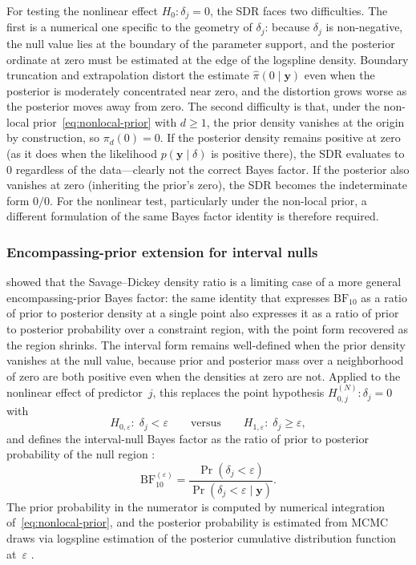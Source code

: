 \documentclass{article}
\begin{document}
For testing the nonlinear effect $H_0:\delta_j=0$, the SDR faces
two difficulties.
The first is a numerical one specific to the geometry of $\delta_j$:
because $\delta_j$ is non-negative, the null value lies at the boundary of the
parameter support, and the posterior ordinate at zero must be
estimated at the edge of the logspline density.
Boundary truncation and extrapolation distort the estimate
$\hat\pi(0\mid\mathbf{y})$ even when the posterior is moderately
concentrated near zero, and the distortion grows worse as the
posterior moves away from zero. The second difficulty is that, under the non-local prior~\eqref{eq:nonlocal-prior} with $d \ge 1$, the prior density vanishes at the origin by construction, so $\pi_d(0)=0$.
If the posterior density remains positive at zero (as it does when
the likelihood $p(\mathbf{y}\mid\delta)$ is positive there), the
SDR evaluates to~$0$ regardless of the data---clearly not the
correct Bayes factor.
If the posterior also vanishes at zero (inheriting the prior's
zero), the SDR becomes the indeterminate form $0/0$.
For the nonlinear test, particularly under the non-local prior,
a different formulation of the same Bayes factor identity is
therefore required.


\subsubsection{Encompassing-prior extension for interval nulls\label{subsubsec:intbf}}

\textcite{wetzels2010encompassing} showed that the Savage--Dickey
density ratio is a limiting case of a more general encompassing-prior
Bayes factor: the same identity that expresses $\mathrm{BF}_{10}$ as a
ratio of prior to posterior density at a single point also expresses
it as a ratio of prior to posterior probability over a
constraint region, with the point form recovered as the region
shrinks.
The interval form remains well-defined when the prior density
vanishes at the null value, because prior and posterior mass over a
neighborhood of zero are both positive even when the densities at
zero are not.
Applied to the nonlinear effect of predictor~$j$, this replaces the
point hypothesis $H_{0,j}^{(N)}:\delta_j=0$ with
%
\begin{equation}
\label{eq:interval-null}
H_{0,\varepsilon}:\;\delta_j < \varepsilon
\qquad\text{versus}\qquad
H_{1,\varepsilon}:\;\delta_j \ge \varepsilon,
\end{equation}
%
and defines the interval-null Bayes factor as the ratio of prior to
posterior probability of the null region
\parencite{klugkist2005inequality, wetzels2010encompassing,
mulder2022generalization}:
%
\begin{equation}
\label{eq:bf-interval}
\mathrm{BF}_{10}^{(\varepsilon)}
  = \frac{\Pr(\delta_j < \varepsilon)}
         {\Pr(\delta_j < \varepsilon \mid \mathbf{y})}.
\end{equation}
%
The prior probability in the numerator is computed by numerical
integration of~\eqref{eq:nonlocal-prior}, and the posterior
probability is estimated from MCMC draws via logspline estimation of
the posterior cumulative distribution function at~$\varepsilon$
\parencite{kooperberg1992logspline}.
\end{document}

